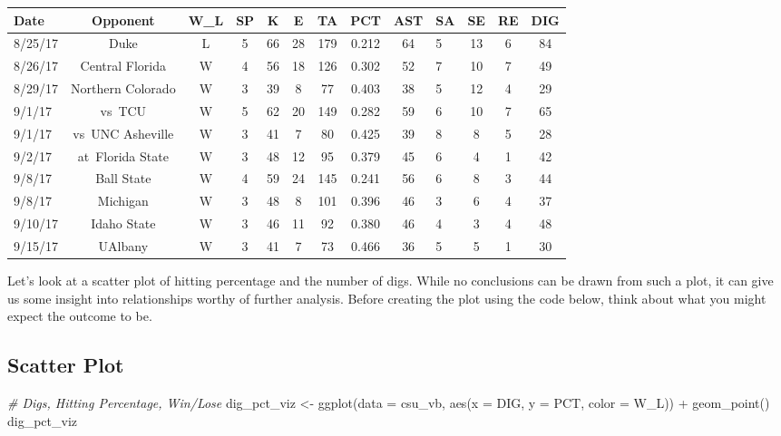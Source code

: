 \documentclass[
  11pt,
]{book}
\newenvironment{Shaded}{\begin{snugshade}}{\end{snugshade}}
\newcommand{\AttributeTok}[1]{\textcolor[rgb]{0.77,0.63,0.00}{#1}}
\newcommand{\CommentTok}[1]{\textcolor[rgb]{0.56,0.35,0.01}{\textit{#1}}}
\newcommand{\FunctionTok}[1]{\textcolor[rgb]{0.00,0.00,0.00}{#1}}
\newcommand{\NormalTok}[1]{#1}
\newcommand{\OtherTok}[1]{\textcolor[rgb]{0.56,0.35,0.01}{#1}}
\newcommand{\SpecialCharTok}[1]{\textcolor[rgb]{0.00,0.00,0.00}{#1}}
\theoremstyle{definition}
\theoremstyle{definition}
\theoremstyle{definition}
\theoremstyle{definition}
\theoremstyle{remark}
\begin{document}
\begin{table}[H]
\centering
\begin{tabular}{l|c|c|c|c|c|c|c|c|l|c|c|c}
\hline
Date & Opponent & W\_L & SP & K & E & TA & PCT & AST & SA & SE & RE & DIG\\
\hline
8/25/17 & Duke & L & 5 & 66 & 28 & 179 & 0.212 & 64 & 5 & 13 & 6 & 84\\
\hline
8/26/17 & Central Florida & W & 4 & 56 & 18 & 126 & 0.302 & 52 & 7 & 10 & 7 & 49\\
\hline
8/29/17 & Northern Colorado & W & 3 & 39 & 8 & 77 & 0.403 & 38 & 5 & 12 & 4 & 29\\
\hline
9/1/17 & vs TCU & W & 5 & 62 & 20 & 149 & 0.282 & 59 & 6 & 10 & 7 & 65\\
\hline
9/1/17 & vs UNC Asheville & W & 3 & 41 & 7 & 80 & 0.425 & 39 & 8 & 8 & 5 & 28\\
\hline
9/2/17 & at Florida State & W & 3 & 48 & 12 & 95 & 0.379 & 45 & 6 & 4 & 1 & 42\\
\hline
9/8/17 & Ball State & W & 4 & 59 & 24 & 145 & 0.241 & 56 & 6 & 8 & 3 & 44\\
\hline
9/8/17 & Michigan & W & 3 & 48 & 8 & 101 & 0.396 & 46 & 3 & 6 & 4 & 37\\
\hline
9/10/17 & Idaho State & W & 3 & 46 & 11 & 92 & 0.380 & 46 & 4 & 3 & 4 & 48\\
\hline
9/15/17 & UAlbany & W & 3 & 41 & 7 & 73 & 0.466 & 36 & 5 & 5 & 1 & 30\\
\hline
\end{tabular}
\end{table}

Let's look at a scatter plot of hitting percentage and the number of digs. While no conclusions can be drawn from such a plot, it can give us some insight into relationships worthy of further analysis. Before creating the plot using the code below, think about what you might expect the outcome to be.

\hypertarget{scatter-plot}{%
\subsection{Scatter Plot}\label{scatter-plot}}

\begin{Shaded}
\begin{Highlighting}[]
\CommentTok{\# Digs, Hitting Percentage, Win/Lose}
\NormalTok{dig\_pct\_viz }\OtherTok{\textless{}{-}} \FunctionTok{ggplot}\NormalTok{(}\AttributeTok{data =}\NormalTok{ csu\_vb, }\FunctionTok{aes}\NormalTok{(}\AttributeTok{x =}\NormalTok{ DIG, }\AttributeTok{y =}\NormalTok{ PCT, }\AttributeTok{color =}\NormalTok{ W\_L)) }\SpecialCharTok{+} \FunctionTok{geom\_point}\NormalTok{()}
\NormalTok{dig\_pct\_viz}
\end{Highlighting}
\end{Shaded}
\end{document}
